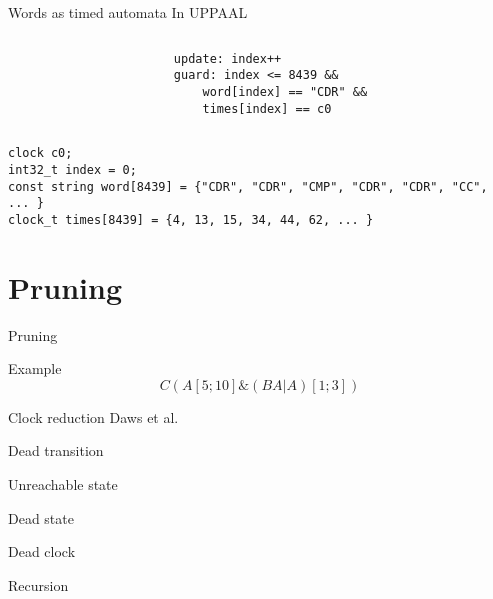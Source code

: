 \begin{frame}[fragile]{Words as timed automata}
    In UPPAAL
    \begin{columns}
        \begin{column}{0.5\textwidth}
            

        \end{column}
        \begin{column}{0.5\textwidth}
            \begin{lstlisting}[basicstyle=\tiny]
update: index++
guard: index <= 8439 &&
    word[index] == "CDR" &&
    times[index] == c0
            \end{lstlisting}
        \end{column}
    \end{columns}
    \begin{lstlisting}[basicstyle=\tiny]
clock c0;
int32_t index = 0;
const string word[8439] = {"CDR", "CDR", "CMP", "CDR", "CDR", "CC", ... }
clock_t times[8439] = {4, 13, 15, 34, 44, 62, ... }
    \end{lstlisting}
\end{frame}

\section{Pruning}
\begin{frame}[shrink=5]{Pruning}
    \begin{center}
        
    \end{center}
\end{frame}
\begin{frame}{Example}
    $$C(A[5;10]\&(BA|A)[1;3])$$
    
\end{frame}
\begin{frame}{Clock reduction}
    Daws et al.
    
\end{frame}
\begin{frame}{Dead transition}
    
    
\end{frame}
\begin{frame}{Unreachable state}
    
    
\end{frame}
\begin{frame}{Dead state}
    
    
\end{frame}
\begin{frame}{Dead clock}
    
    
\end{frame}
\begin{frame}{Recursion}
    
    
\end{frame}

